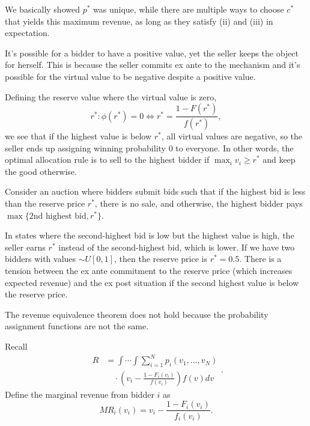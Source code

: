 \begin{remark}	We basically showed $p^*$ was unique, while there are multiple ways to choose $c^*$ that yields this maximum revenue, as long as they satisfy (ii) and (iii) in expectation.
\end{remark}

\begin{remark}	It's possible for a bidder to have a positive value, yet the seller keeps the object for herself. This is because the seller commits ex ante to the mechanism and it's possible for the virtual value to be negative despite a positive value.

	Defining the reserve value where the virtual value is zero, \[
		r^* : \phi(r^*) = 0 \iff r^* = \frac{1-F(r^*)}{f(r^*)}
	,\] we see that if the highest value is below $r^*$, all virtual values are negative, so the seller ends up assigning winning probability $0$ to everyone. In other words, the optimal allocation rule is to sell to the highest bidder if $\max_i v_i \ge r^*$ and keep the good otherwise.
\end{remark}

\begin{example}
	Consider an auction where bidders submit bids such that if the highest bid is less than the reserve price $r^*$, there is no sale, and otherwise, the highest bidder pays $\max\{\text{2nd highest bid}, r^*\}$.

	In states where the second-highest bid is low but the highest value is high, the seller earns $r^*$ instead of the second-highest bid, which is lower. If we have two bidders with values $\sim U[0,1]$, then the reserve price is $r^* = 0.5$. There is a tension between the ex ante commitment to the reserve price (which increases expected revenue) and the ex post situation if the second highest value is below the reserve price.

	The revenue equivalence theorem does not hold because the probability assignment functions are not the same.
\end{example}

	\begin{definition}
		Recall \[
			\begin{aligned}
				R
				&= \int \cdots \int \sum\limits_{i=1}^{N} p_i (v_1,\ldots,v_N) \\
				&\quad \cdot \left( v_i - \frac{1-F_i(v_i)}{f(v_i)} \right) f(v)dv
			\end{aligned}
		.\] 
		Define the marginal revenue from bidder $i$ as \[
			MR_i(v_i) = v_i - \frac{1-F_i(v_i)}{f_i(v_i)}
		.\] 
\end{definition}

